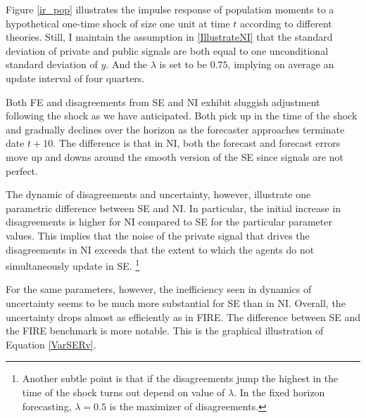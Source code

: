 \documentclass[12pt]{article}
\begin{document}
	Figure \ref{ir_pop} illustrates the impulse response of population moments to a hypothetical one-time shock of size one unit at time $t$ according to different theories. Still, I maintain the assumption in \ref{IllustrateNI} that the standard deviation of private and public signals are both equal to one unconditional standard deviation of $y$.  And the $\lambda$ is set to be $0.75$, implying on average an update interval of four quarters.  
	
	
	Both FE and disagreements from SE and NI exhibit sluggish adjustment following the shock as we have anticipated. Both pick up in the time of the shock and gradually declines over the horizon as the forecaster approaches terminate date $t+10$. The difference is that in NI, both the forecast and forecast errors move up and downs around the smooth version of the SE since signals are not perfect. 
	
	The dynamic of disagreements and uncertainty, however,  illustrate one parametric difference between SE and NI. In particular,  the initial increase in disagreements is higher for NI compared to SE for the particular parameter values. This implies that the noise of the private signal that drives the disagreements in NI exceeds that the extent to which the agents do not simultaneously update in SE. \footnote{Another subtle point is that if the disagreements jump the highest in the time of the shock turns out depend on value of $\lambda$. In the fixed horizon forecasting, $\lambda=0.5$ is the maximizer of disagreements.}
	
	For the same parameters, however, the inefficiency seen in dynamics of uncertainty seems to be much more substantial for SE than in NI. Overall, the uncertainty drops almost as efficiently as in FIRE. The difference between SE and the FIRE benchmark is more notable. This is the graphical illustration of Equation \ref{VarSERv}. 
	
\end{document}
